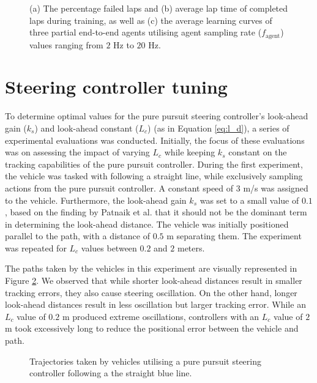 \begin{figure}[htb!]
    \centering
    
    \caption[Learning curves for partial end-to-end agents trained with different agent sampling rates]{(a) The percentage failed laps and (b) average lap time of completed laps during training, as well as (c) the average learning curves of three partial end-to-end agents utilising agent sampling rate ($f_{\text{agent}}$) values ranging from $2$ Hz to $20$ Hz.}
    \label{fig:f_agent_pete}
\end{figure}




\section{Steering controller tuning}

To determine optimal values for the pure pursuit steering controller's look-ahead gain ($k_s$) and look-ahead constant ($L_c$) (as in Equation \ref{eq:l_d}), a series of experimental evaluations was conducted. 
Initially, the focus of these evaluations was on assessing the impact of varying $L_c$ while keeping $k_s$ constant on the tracking capabilities of the pure pursuit controller.
During the first experiment, the vehicle was tasked with following a straight line, while exclusively sampling actions from the pure pursuit controller. 
A constant speed of $3$ m/s was assigned to the vehicle.
Furthermore, the look-ahead gain $k_s$ was set to a small value of $0.1$, based on the finding by Patnaik et al. \cite{Patnaik2020} that it should not be the dominant term in determining the look-ahead distance.
The vehicle was initially positioned parallel to the path, with a distance of $0.5$ m separating them. 
The experiment was repeated for $L_c$ values between $0.2$ and $2$ meters.

The paths taken by the vehicles in this experiment are visually represented in Figure \ref{fig:lfc}. 
We observed that while shorter look-ahead distances result in smaller tracking errors, they also cause steering oscillation.
On the other hand, longer look-ahead distances result in less oscillation but larger tracking error.
While an $L_c$ value of $0.2$ m produced extreme oscillations, controllers with an $L_c$ value of $2$ m took excessively long to reduce the positional error between the vehicle and path. 

\begin{figure}[b]
    \centering
    
    \caption[Tracjectories taken by vehicles following a straight line starting from an offset position]{Trajectories taken by vehicles utilising a pure pursuit steering controller following a the straight blue line.}
    \label{fig:lfc}
\end{figure}

